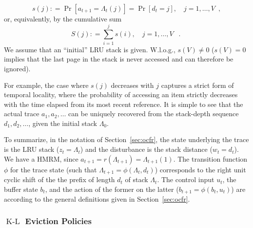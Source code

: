 \documentclass[11pt,a4paper]{article}
\DeclareMathOperator{\Pb}{Pr}
\DeclareMathOperator{\kl}{K-L}
\DeclareMathOperator{\mf}{\enspace .}
\newcommand{\deq}{\mathrel{\mathop:}=}
\theoremstyle{definition}
\theoremstyle{remark}
\begin{document}
\begin{equation}
  s(j) \deq \Pb[a_{t+1}=\Lambda_{t}(j)]=\Pr[d_t=j],
  \quad j=1, \ldots, V\enspace,
\end{equation}
or, equivalently, by the cumulative sum
\begin{equation}
  S(j) \deq \sum_{i=1}^j s(i), \quad j=1, \ldots, V \mf
\end{equation} 
We assume that an ``initial'' LRU stack is given. W.l.o.g., $s(V)\not = 0$
($s(V)=0$ implies that the last page in the stack is never accessed and can
therefore be ignored).

For example, the case where $s(j)$ decreases with $j$ captures a
strict form of temporal locality, where the probability of accessing
an item strictly decreases with the time elapsed from its most recent
reference.  It is simple to see that the actual trace $a_1,a_2,
\ldots$ can be uniquely recovered from the stack-depth sequence
$d_1,d_2, \ldots$, given the initial stack $\Lambda_0$.

To summarize, in the notation of Section~\ref{sec:ocfr}, the state
underlying the trace is the LRU stack ($z_t=\Lambda_t$) and the
disturbance is the stack distance ($w_t=d_t$). We have a HMRM, since
$a_{t+1}=r(\Lambda_{t+1})=\Lambda_{t+1}(1)$. The transition function $\phi$ for the trace
state (such that $\Lambda_{t+1} = \phi(\Lambda_t,d_t)$) corresponds to
the right unit cyclic shift of the the prefix of length $d_t$ of stack
$\Lambda_t$. The control input $u_t$, the buffer state $b_t$, and the
action of the former on the latter ($b_{t+1}=\phi(b_t,u_t) $) are
according to the general definitions given in  Section~\ref{sec:ocfr}.

\subsubsection{$\kl$ Eviction Policies}
\label{sec:an-optimal-stack}
\end{document}
